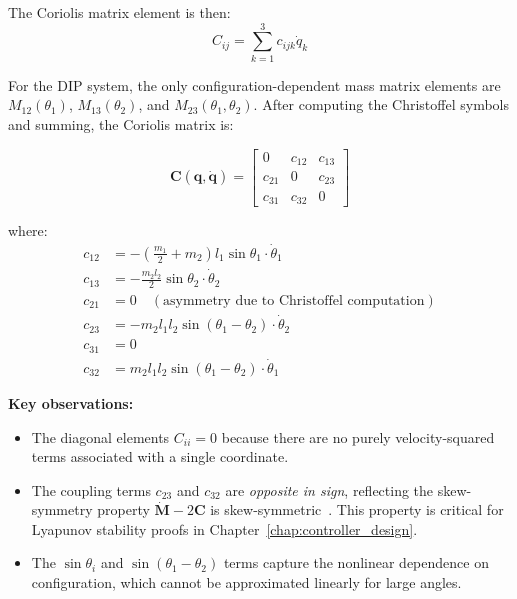 The Coriolis matrix element is then:
\begin{equation}
C_{ij} = \sum_{k=1}^{3} c_{ijk} \dot{q}_k
\label{eq:coriolis_element}
\end{equation}

For the DIP system, the only configuration-dependent mass matrix elements are $M_{12}(\theta_1)$, $M_{13}(\theta_2)$, and $M_{23}(\theta_1, \theta_2)$. After computing the Christoffel symbols and summing, the Coriolis matrix is:

\begin{equation}
\mathbf{C}(\mathbf{q}, \dot{\mathbf{q}}) = \begin{bmatrix}
0 & c_{12} & c_{13} \\
c_{21} & 0 & c_{23} \\
c_{31} & c_{32} & 0
\end{bmatrix}
\label{eq:coriolis_matrix}
\end{equation}

where:
\begin{align}
c_{12} &= -\left(\frac{m_1}{2} + m_2\right) l_1 \sin\theta_1 \cdot \dot{\theta}_1 \label{eq:c12} \\
c_{13} &= -\frac{m_2 l_2}{2}\sin\theta_2 \cdot \dot{\theta}_2 \label{eq:c13} \\
c_{21} &= 0 \quad (\text{asymmetry due to Christoffel computation}) \label{eq:c21} \\
c_{23} &= -m_2 l_1 l_2 \sin(\theta_1 - \theta_2) \cdot \dot{\theta}_2 \label{eq:c23} \\
c_{31} &= 0 \label{eq:c31} \\
c_{32} &= m_2 l_1 l_2 \sin(\theta_1 - \theta_2) \cdot \dot{\theta}_1 \label{eq:c32}
\end{align}

\textbf{Key observations:}
\begin{itemize}
\item The diagonal elements $C_{ii} = 0$ because there are no purely velocity-squared terms associated with a single coordinate.

\item The coupling terms $c_{23}$ and $c_{32}$ are \textit{opposite in sign}, reflecting the skew-symmetry property $\dot{\mathbf{M}} - 2\mathbf{C}$ is skew-symmetric~\cite{slotine1991applied}. This property is critical for Lyapunov stability proofs in Chapter~\ref{chap:controller_design}.

\item The $\sin\theta_i$ and $\sin(\theta_1 - \theta_2)$ terms capture the nonlinear dependence on configuration, which cannot be approximated linearly for large angles.
\end{itemize}


